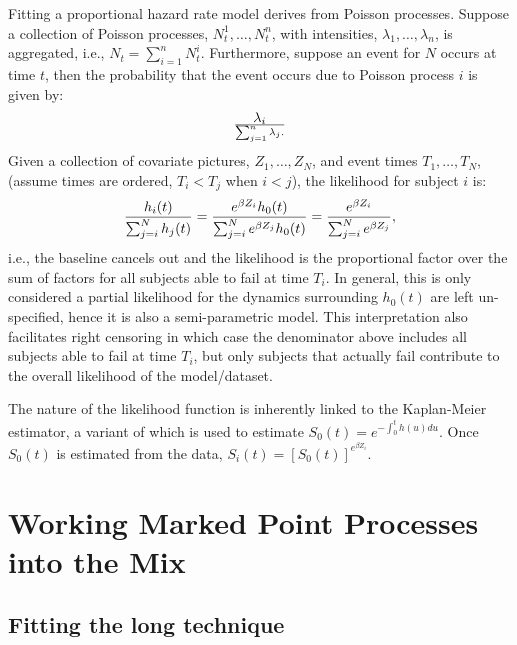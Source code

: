 \documentclass[10pt]{article}
\begin{document}
Fitting a proportional hazard rate model derives from Poisson processes.  Suppose a collection of Poisson processes, $N^1_t, \ldots, N^n_t$, with intensities,
$\lambda_1, \ldots, \lambda_n$, is aggregated, i.e., $N_t=\sum_{i=1}^n N^i_t$.  Furthermore, suppose an event for $N$ occurs at time $t$, then the probability
that the event occurs due to Poisson process $i$ is given by:
$$\lambda_i \over \sum_{j=1}^n \lambda_j.$$
Given a collection of covariate pictures, $Z_1, \ldots, Z_N$, and event times $T_1, \ldots, T_N$, (assume times are ordered, $T_i<T_j$ when $i<j$), 
the likelihood for subject $i$ is:
$$ { h_i(t) \over \sum_{j=i}^N h_j(t) } = {e^{\beta Z_i}h_0(t) \over \sum_{j=i}^N e^{\beta Z_j}h_0(t)}= {e^{\beta Z_i} \over \sum_{j=i}^N e^{\beta Z_j}},$$
i.e., the baseline cancels out and the likelihood is the proportional factor over the sum of factors for all subjects able to fail at time $T_i$.
In general, this is only considered a partial likelihood for the dynamics surrounding $h_0(t)$ are left un-specified, hence it is also a semi-parametric model.
This interpretation also facilitates right censoring in which case the denominator above includes all subjects able to fail at time $T_i$, but only
subjects that actually fail contribute to the overall likelihood of the model/dataset.
 
The nature of the likelihood function is inherently linked to the Kaplan-Meier estimator, a variant of which is used to estimate $S_0(t)=e^{-\int_0^th(u)du}$. 
Once $S_0(t)$ is estimated from the data, $S_i(t)=[S_0(t)]^{e^{\beta Z_i}}$.

\section{Working Marked Point Processes into the Mix}

\subsection{Fitting the long technique}
\end{document}
